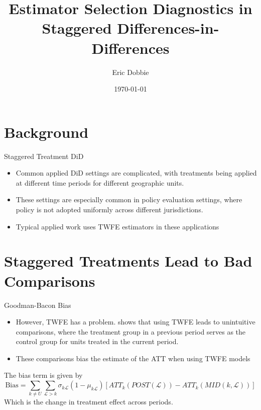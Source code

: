 \documentclass[11pt]{beamer}
\title[Estimator Selection]{Estimator Selection Diagnostics in Staggered Differences-in-Differences}
\author[Eric Dobbie]{Eric Dobbie}
\institute[Emory]{Emory University\\Department of Political Science}
\date{\today}
\begin{document}
\begin{frame}\titlepage
\end{frame}

\section{Background}

\begin{frame}{Staggered Treatment DiD}
    \begin{itemize}
        \item Common applied DiD settings are complicated, with treatments being applied at different time periods for different geographic units.
        \item These settings are especially common in policy evaluation settings, where policy is not adopted uniformly across different jurisdictions.
        \item Typical applied work uses TWFE estimators in these applications
    \end{itemize}
\end{frame}

\section{Staggered Treatments Lead to Bad Comparisons}

\begin{frame}{Goodman-Bacon Bias}
    \begin{itemize}
        \item However, TWFE has a problem. \textcite{goodman2021difference} shows that using TWFE leads to unintuitive comparisons, where the treatment group in a previous period serves as the control group for units treated in the current period.
        \item These comparisons bias the estimate of the ATT when using TWFE models
    \end{itemize}

    The bias term is given by 
    \begin{equation}\label{eq:biastwfe}
        \text{Bias} = \sum_{k \not = U} \sum_{\mathcal{L} > k} \sigma_{k \mathcal{L}} (1 - \mu_{k\mathcal{L}})[ATT_k(POST(\mathcal{L})) - ATT_k(MID(k,\mathcal{L}))]
    \end{equation}
    Which is the change in treatment effect across periods.
\end{frame}
\end{document}
